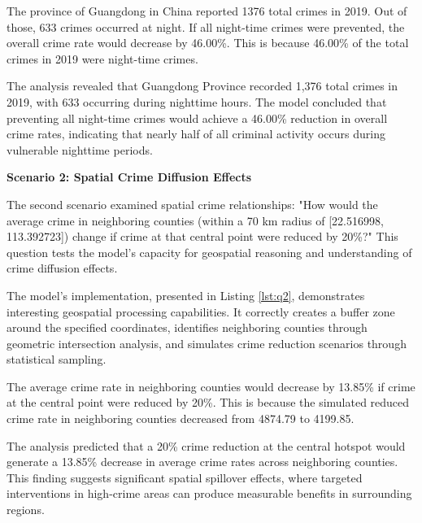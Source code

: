 \begin{tcolorbox}[colback=white!95!black, colframe=black, title=Q1 Response, fontupper=\scriptsize, boxsep=2pt, left=3pt, right=3pt]
  The province of Guangdong in China reported 1376 total crimes in 2019. Out of those, 633 crimes occurred at night. If all night-time crimes were prevented, the overall crime rate would decrease by 46.00\%. This is because 46.00\% of the total crimes in 2019 were night-time crimes.
\end{tcolorbox}

The analysis revealed that Guangdong Province recorded 1,376 total crimes in 2019, with 633 occurring during nighttime hours. The model concluded that preventing all night-time crimes would achieve a 46.00\% reduction in overall crime rates, indicating that nearly half of all criminal activity occurs during vulnerable nighttime periods.



\noindent \textbf{Scenario 2: Spatial Crime Diffusion Effects}

The second scenario examined spatial crime relationships: "How would the average crime in neighboring counties (within a 70 km radius of [22.516998, 113.392723]) change if crime at that central point were reduced by 20\%?" This question tests the model's capacity for geospatial reasoning and understanding of crime diffusion effects.

The model's implementation, presented in Listing \ref{lst:q2}, demonstrates interesting geospatial processing capabilities. It correctly creates a buffer zone around the specified coordinates, identifies neighboring counties through geometric intersection analysis, and simulates crime reduction scenarios through statistical sampling.



\begin{tcolorbox}[colback=white!95!black, colframe=black, title=Q2 Response, fontupper=\scriptsize, boxsep=2pt, left=3pt, right=3pt]
  The average crime rate in neighboring counties would decrease by 13.85\% if crime at the central point were reduced by 20\%. This is because the simulated reduced crime rate in neighboring counties decreased from 4874.79 to 4199.85.
\end{tcolorbox}

The analysis predicted that a 20\% crime reduction at the central hotspot would generate a 13.85\% decrease in average crime rates across neighboring counties. This finding suggests significant spatial spillover effects, where targeted interventions in high-crime areas can produce measurable benefits in surrounding regions.




